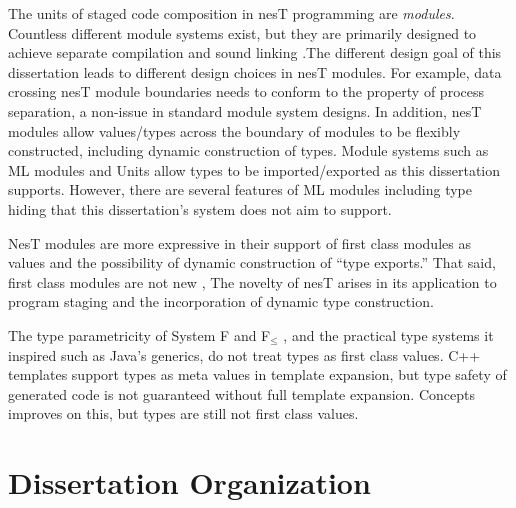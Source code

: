 The units of staged code composition in nesT programming are \emph{modules}. Countless different
module systems exist, but they are primarily designed to achieve separate compilation and sound
linking \cite{Cardelli-1997}.The different design goal of this dissertation leads to different design choices in nesT
modules. For example, data crossing nesT module boundaries needs to conform to the property of
process separation, a non-issue in standard module system designs. In addition, nesT modules
allow values/types across the boundary of modules to be flexibly constructed, including dynamic
construction of types. Module systems such as ML modules \cite{macqueen84} and Units
\cite{flatt98units} allow types to be imported/exported as this dissertation supports. However, there are
several features of ML modules including type hiding that this dissertation's system does not aim to support.

NesT modules are more expressive in their support of first class modules as values and the
possibility of dynamic construction of ``type exports.'' That said, first class modules are not
new \cite{99620,ancona01calculus}, The novelty of nesT arises in its application to program
staging and the incorporation of dynamic type construction.

The type parametricity of System F and F$_\le$ \cite{Cardelli-1985}, and the practical type
systems it inspired such as Java's generics, do not treat types as first class values. C++
templates support types as meta values in template expansion, but type safety of generated code
is not guaranteed without full template expansion. Concepts \cite{gregor06:_concepts} improves
on this, but types are still not first class values.

\section{Dissertation Organization}

